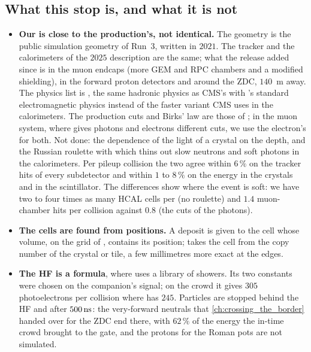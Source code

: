 \subsection{What this stop is, and what it is not}
\label{sec:crowd_at_the_border:caveats}
\begin{itemize}
  \item \textbf{Our \GEANT is close to the production's, not identical.}
    The geometry is the public simulation geometry of Run~3, written in
    $2021$. The tracker and the calorimeters of the $2025$ description are
    the same; what the release added since is in the muon endcaps (more GEM
    and RPC chambers and a modified shielding), in the forward proton
    detectors and around the ZDC, $140$~m away. The physics list is
    , the same hadronic physics as CMS's
     with \GEANT's standard electromagnetic physics
    instead of the faster variant CMS uses in the calorimeters. The
    production cuts and Birks' law are those of \CMSSW; in the muon system,
    where \CMSSW gives photons and electrons different cuts, we use the
    electron's for both. Not done: the dependence of the light of a
    crystal on the depth, and the Russian roulette with which \CMSSW thins
    out slow neutrons and soft photons in the calorimeters. Per pileup
    collision the two agree within $6\,\%$ on the tracker hits of every
    subdetector and within $1$ to $8\,\%$ on the energy in the crystals and
    in the scintillator. The differences show where the event is soft: we
    have two to four times as many HCAL cells per \GeV (no roulette) and
    $1.4$ muon-chamber hits per collision against $0.8$ (the cuts of the
    photons).
  \item \textbf{The cells are found from positions.} A deposit is given to
    the cell whose volume, on the grid of , contains
    its position; \CMSSW takes the cell from the copy number of the crystal
    or tile, a few millimetres more exact at the edges.
  \item \textbf{The HF is a formula}, where \CMSSW uses a library of
    showers. Its two constants were chosen on the companion's signal; on the
    crowd it gives $305$ photoelectrons per collision where \CMSSW has $245$.
    Particles are stopped behind the HF and after $500\,\mathrm{ns}$: the very-forward
    neutrals that \cref{ch:crossing_the_border} handed over for the ZDC end
    there, with $62\,\%$ of the energy the in-time crowd brought to the
    gate, and the protons for the Roman pots are not simulated.

\end{itemize}
